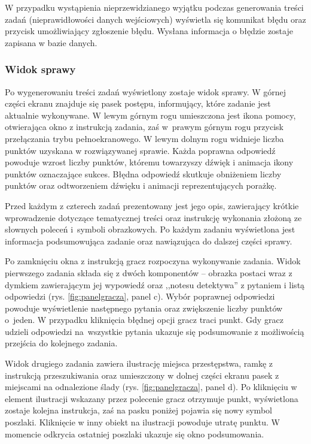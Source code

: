         W przypadku wystąpienia nieprzewidzianego wyjątku podczas generowania treści zadań (nieprawidłowości danych wejściowych) wyświetla się komunikat błędu oraz przycisk umożliwiający zgłoszenie błędu.
        Wysłana informacja o błędzie zostaje zapisana w bazie danych.
        
        \subsubsection{Widok sprawy}
        Po wygenerowaniu treści zadań wyświetlony zostaje widok sprawy.
        W górnej części ekranu znajduje się pasek postępu, informujący, które zadanie jest aktualnie wykonywane.
        W lewym górnym rogu umieszczona jest ikona pomocy, otwierająca okno z instrukcją zadania, zaś w~prawym górnym rogu przycisk przełączania trybu pełnoekranowego.
        W lewym dolnym rogu widnieje liczba punktów uzyskana w rozwiązywanej sprawie.
        Każda poprawna odpowiedź powoduje wzrost liczby punktów, któremu towarzyszy dźwięk i animacja ikony punktów oznaczające sukces.
        Błędna odpowiedź skutkuje obniżeniem liczby punktów oraz odtworzeniem dźwięku i animacji reprezentujących porażkę.
        
        Przed każdym z czterech zadań prezentowany jest jego opis, zawierający krótkie wprowadzenie dotyczące tematycznej treści oraz instrukcję wykonania złożoną ze słownych poleceń i~symboli obrazkowych.
        Po każdym zadaniu wyświetlona jest informacja podsumowująca zadanie oraz nawiązująca do dalszej części sprawy.
        
        Po zamknięciu okna z instrukcją gracz rozpoczyna wykonywanie zadania.
        Widok pierwszego zadania składa się z dwóch komponentów -- obrazka postaci wraz z dymkiem zawierającym jej wypowiedź oraz ,,notesu detektywa'' z pytaniem i listą odpowiedzi (rys. \ref{fig:panelgracza}, panel c).
        Wybór poprawnej odpowiedzi powoduje wyświetlenie następnego pytania oraz zwiększenie liczby punktów o~jeden.
        W przypadku kliknięcia błędnej opcji gracz traci punkt.
        Gdy gracz udzieli odpowiedzi na~wszystkie pytania ukazuje się podsumowanie z możliwością przejścia do kolejnego zadania.
        
        Widok drugiego zadania zawiera ilustrację miejsca przestępstwa, ramkę z instrukcją przeszukiwania oraz umieszczony w dolnej części ekranu pasek z miejscami na odnalezione ślady (rys. \ref{fig:panelgracza}, panel d).
        Po kliknięciu w element ilustracji wskazany przez polecenie gracz otrzymuje punkt, wyświetlona zostaje kolejna instrukcja, zaś na pasku poniżej pojawia się nowy symbol poszlaki.
        Kliknięcie w inny obiekt na ilustracji powoduje utratę punktu.
        W momencie odkrycia ostatniej poszlaki ukazuje się okno podsumowania.
        
